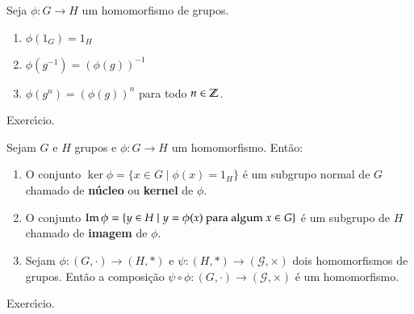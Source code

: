 \begin{lema}
	Seja $\phi : G \to H$ um homomorfismo de grupos.
	\begin{enumerate}[label=({\roman*})]
		\item $\phi(1_G) = 1_H$
		\item $\phi(g^{-1}) = (\phi(g))^{-1}$
		\item $\phi(g^n) = (\phi(g))^n$ para todo $n \in \mathbb{Z}$.
	\end{enumerate}
\end{lema}
\begin{prova}
	Exerc{\'\i}cio.
\end{prova}

\begin{lema}
	Sejam $G$ e $H$ grupos e $\phi : G \to H$ um homomorfismo. Ent\~ao:
	\begin{enumerate}[label=({\roman*})]
		\item O conjunto $\ker\phi = \{x \in G \mid \phi(x) = 1_H\}$ \'e um subgrupo normal de $G$ chamado de \textbf{n\'ucleo} ou \textbf{kernel} de $\phi$.

		\item O conjunto ${\rm Im\,}\phi = \{y \in H \mid y = \phi(x) \mbox{ para algum } x \in G\}$ \'e um subgrupo de $H$ chamado de \textbf{imagem} de $\phi.$

		\item Sejam $\phi : (G, \cdot) \to (H, *)$ e $\psi : (H,*) \to (\mathcal{G},\times)$ dois homomorfismos de grupos. Ent\~ao a composi\c{c}\~ao $\psi\circ\phi : (G, \cdot) \to (\mathcal{G}, \times)$ \'e um homomorfismo.
	\end{enumerate}
\end{lema}
\begin{prova}
	Exerc{\'\i}cio.
\end{prova}

